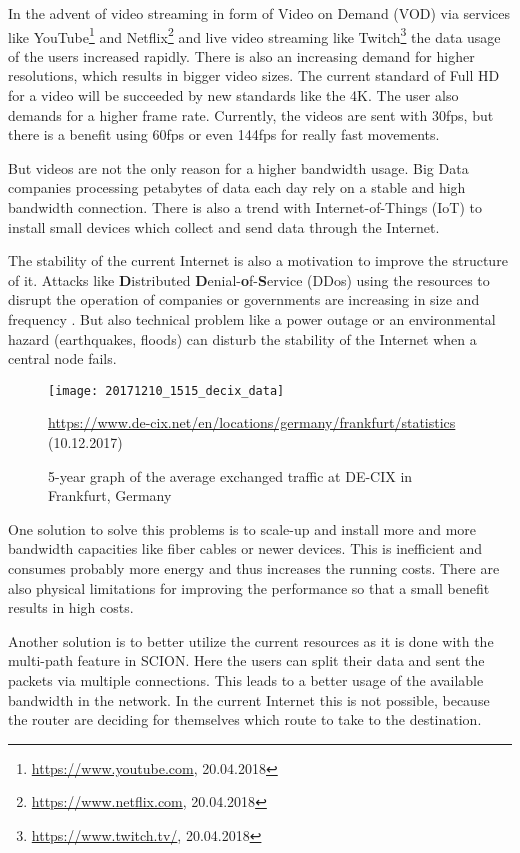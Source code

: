 \documentclass[thesis.tex]{subfiles}
\begin{document}
In the advent of video streaming in form of Video on Demand (VOD) via services like YouTube\footnote{\url{https://www.youtube.com}, 20.04.2018} and Netflix\footnote{\url{https://www.netflix.com}, 20.04.2018} and live video streaming like Twitch\footnote{\url{https://www.twitch.tv/}, 20.04.2018} the data usage of the users increased rapidly. There is also an increasing demand for higher resolutions, which results in bigger video sizes. The current standard of Full HD for a video will be succeeded by new standards like the 4K. The user also demands for a higher frame rate. Currently, the videos are sent with 30fps, but there is a benefit using 60fps or even 144fps for really fast movements.

But videos are not the only reason for a higher bandwidth usage. Big Data companies processing petabytes of data each day rely on a stable and high bandwidth connection. There is also a trend with Internet-of-Things (IoT) to install small devices which collect and send data through the Internet.

The stability of the current Internet is also a motivation to improve the structure of it. Attacks like \textbf{D}istributed \textbf{D}enial-\textbf{o}f-\textbf{S}ervice (DDos) using the resources to disrupt the operation of companies or governments are increasing in size and frequency \cite{GoogleInc.2013}. But also technical problem like a power outage \cite{DECIX.10.04.2018} or an environmental hazard (earthquakes, floods) can disturb the stability of the Internet when a central node fails. 

\begin{figure}
    \centering
    \texttt{[image: 20171210\_1515\_decix\_data]}
    \caption*{\tiny{ \url{https://www.de-cix.net/en/locations/germany/frankfurt/statistics} (10.12.2017)}}
    \caption{5-year graph of the average exchanged traffic at DE-CIX in Frankfurt, Germany}
    \label{fig:intro:decixData}
\end{figure}

One solution to solve this problems is to scale-up and install more and more bandwidth capacities like fiber cables or newer devices. This is inefficient and consumes probably more energy and thus increases the running costs. There are also physical limitations for improving the performance so that a small benefit results in high costs.

Another solution is to better utilize the current resources as it is done with the multi-path feature in SCION. Here the users can split their data and sent the packets via multiple connections. This leads to a better usage of the available bandwidth in the network. In the current Internet this is not possible, because the router are deciding for themselves which route to take to the destination. 
\end{document}

